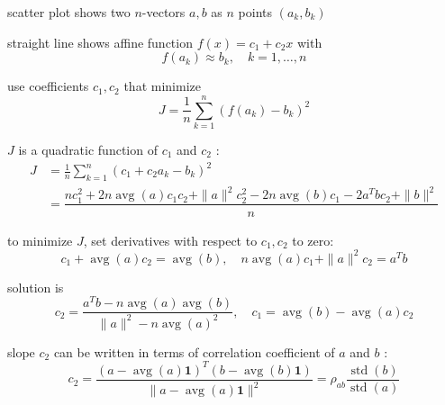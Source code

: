 scatter plot shows two $ n $-vectors $ a, b $ as $ n $ points $ \left(a_{k}, b_{k}\right) $

straight line shows affine function $ f(x)=c_{1}+c_{2} x $ with
\begin{equation}
f\left(a_{k}\right) \approx b_{k}, \quad k=1, \ldots, n
\end{equation}

\begin{problem}
    use coefficients $ c_{1}, c_{2} $ that minimize \begin{equation} J=\frac{1}{n} \sum_{k=1}^{n}\left(f\left(a_{k}\right)-b_{k}\right)^{2} \end{equation}

    $ J $ is a quadratic function of $ c_{1} $ and $ c_{2} $ :
\begin{equation}
\begin{aligned}
J &=\frac{1}{n} \sum_{k=1}^{n}\left(c_{1}+c_{2} a_{k}-b_{k}\right)^{2} \\
&=  \dfrac{n c_{1}^{2}+2 n \operatorname{a v g}(a) c_{1} c_{2}+\|a\|^{2} c_{2}^{2}-2 n \operatorname{avg}(b) c_{1}-2 a^{T} b c_{2}+\|b\|^{2}}{ n}
\end{aligned}
\end{equation}
\end{problem}

to minimize $ J $, set derivatives with respect to $ c_{1}, c_{2} $ to zero:
\begin{equation}
c_{1}+\operatorname{avg}(a) c_{2}=\operatorname{avg}(b), \quad n \operatorname{avg}(a) c_{1}+\|a\|^{2} c_{2}=a^{T} b
\end{equation}

\begin{theorem}
    solution is
\begin{equation}
c_{2}=\frac{a^{T} b-n \operatorname{avg}(a) \operatorname{avg}(b)}{\|a\|^{2}-n \operatorname{avg}(a)^{2}}, \quad c_{1}=\operatorname{avg}(b)-\operatorname{avg}(a) c_{2}
\end{equation}
\end{theorem}

\begin{corollary}
    slope $ c_{2} $ can be written in terms of correlation coefficient of $ a $ and $ b $ :
\begin{equation}
c_{2}=\frac{(a-\operatorname{avg}(a) \mathbf{1})^{T}(b-\operatorname{a v g}(b) \mathbf{1})}{\|a-\operatorname{a v g}(a) \mathbf{1}\|^{2}}=\rho_{a b} \frac{\operatorname{std}(b)}{\operatorname{std}(a)}
\end{equation}
\end{corollary}


